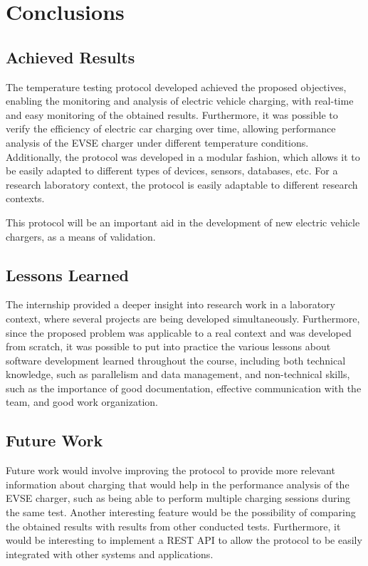 \section{Conclusions}


\subsection{Achieved Results} 	
The temperature testing protocol developed achieved the proposed objectives, 
enabling the monitoring and analysis of electric vehicle charging, with real-time and easy monitoring of the obtained results. Furthermore, it was possible to verify the 
efficiency of electric car charging over time, allowing performance analysis of the EVSE charger under different temperature 
conditions.
Additionally, the protocol was developed in a modular fashion, which allows it to be easily adapted to different types of devices,
sensors, databases, etc. 
For a research laboratory context, the protocol is easily adaptable to different 
research contexts. 

This protocol will be an important aid in the development of new electric vehicle chargers, as a means of validation.


\subsection{Lessons Learned} 	
The internship provided a deeper insight into research work in a laboratory context, where several projects are being developed simultaneously. Furthermore, since the proposed problem was applicable to a real context and was developed from scratch, it was possible to put into practice the various lessons about software development learned throughout the course, including both technical knowledge, such as parallelism and data management, and non-technical skills, such as the importance of good documentation, effective communication with the team, and good work organization.

\subsection{Future Work} 
Future work would involve improving the protocol to provide more relevant information about charging
that would help in the performance analysis of the EVSE charger, such as being able to perform multiple charging 
sessions during the same test. 
Another interesting feature would be the possibility of comparing the obtained results with results from other conducted tests.
Furthermore, it would be interesting to implement a REST API to allow the protocol to be easily integrated with other systems and applications.
	
